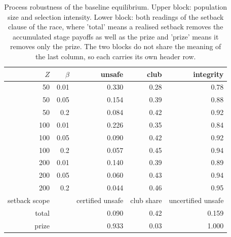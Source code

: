 \begin{table}[t]
\centering
\caption{Process robustness of the baseline equilibrium.  Upper
block: population size and selection intensity.  Lower block: both
readings of the setback clause of the race, where 'total' means a
realised setback removes the accumulated stage payoffs as well as
the prize and 'prize' means it removes only the prize.  The two
blocks do not share the meaning of the last column, so each carries
its own header row.}
\label{tab:robustness}
\small
\begin{tabular}{rrrrr}
\toprule
$Z$ & $\beta$ & unsafe & club & integrity \\
\midrule
50 & 0.01 & 0.330 & 0.28 & 0.78 \\
50 & 0.05 & 0.154 & 0.39 & 0.88 \\
50 & 0.2 & 0.084 & 0.42 & 0.92 \\
100 & 0.01 & 0.226 & 0.35 & 0.84 \\
100 & 0.05 & 0.090 & 0.42 & 0.92 \\
100 & 0.2 & 0.057 & 0.45 & 0.94 \\
200 & 0.01 & 0.140 & 0.39 & 0.89 \\
200 & 0.05 & 0.060 & 0.43 & 0.94 \\
200 & 0.2 & 0.044 & 0.46 & 0.95 \\
\midrule
setback scope & & certified unsafe & club share & uncertified unsafe \\
\midrule
total & & 0.090 & 0.42 & 0.159 \\
prize & & 0.933 & 0.03 & 1.000 \\
\bottomrule
\end{tabular}
\end{table}
